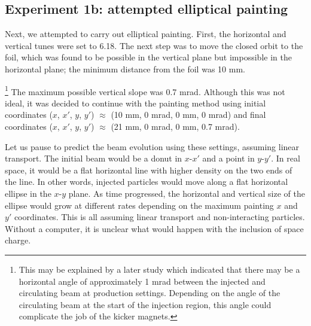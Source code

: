 \subsection{Experiment 1b: attempted elliptical painting}

Next, we attempted to carry out elliptical painting. First, the horizontal and vertical tunes were set to 6.18. The next step was to move the closed orbit to the foil, which was found to be possible in the vertical plane but impossible in the horizontal plane; the minimum distance from the foil was 10 mm.

\footnote{This may be explained by a later study which indicated that there may be a horizontal angle of approximately 1 mrad between the injected and circulating beam at production settings. Depending on the angle of the circulating beam at the start of the injection region, this angle could complicate the job of the kicker magnets.} The maximum possible vertical slope was 0.7 mrad. Although this was not ideal, it was decided to continue with the painting method using initial coordinates ($x$, $x'$, $y$, $y'$) $\approx$ (10 mm, 0 mrad, 0 mm, 0 mrad) and final coordinates ($x$, $x'$, $y$, $y'$) $\approx$ (21 mm, 0 mrad, 0 mm, 0.7 mrad).

Let us pause to predict the beam evolution using these settings, assuming linear transport. The initial beam would be a donut in $x$-$x'$ and a point in $y$-$y'$. In real space, it would be a flat horizontal line with higher density on the two ends of the line. In other words, injected particles would move along a flat horizontal ellipse in the $x$-$y$ plane. As time progressed, the horizontal and vertical size of the ellipse would grow at different rates depending on the maximum painting $x$ and $y'$ coordinates. This is all assuming linear transport and non-interacting particles. Without a computer, it is unclear what would happen with the inclusion of space charge.

